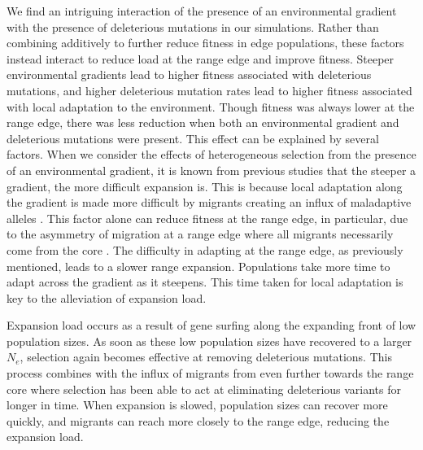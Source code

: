 We find an intriguing interaction of the presence of an environmental gradient with the presence of deleterious mutations in our simulations. Rather than combining additively to further reduce fitness in edge populations, these factors instead interact to reduce load at the range edge and improve fitness. Steeper environmental gradients lead to higher fitness associated with deleterious mutations, and higher deleterious mutation rates lead to higher fitness associated with local adaptation to the environment. Though fitness was always lower at the range edge, there was less reduction when both an environmental gradient and deleterious mutations were present. This effect can be explained by several factors. 
When we consider the effects of heterogeneous selection from the presence of an environmental gradient, it is known from previous studies that the steeper a gradient, the more difficult expansion is. This is because local adaptation along the gradient is made more difficult by migrants creating an influx of maladaptive alleles \citep{Kirkpatrick:1997, Barton:2001, Polechova:2015}. This factor alone can reduce fitness at the range edge, in particular, due to the asymmetry of migration at a range edge where all migrants necessarily come from the core \citep{Kirkpatrick:1997}. The difficulty in adapting at the range edge, as previously mentioned, leads to a slower range expansion. Populations take more time to adapt across the gradient as it steepens. This time taken for local adaptation is key to the alleviation of expansion load.

Expansion load occurs as a result of gene surfing along the expanding front of low population sizes. As soon as these low population sizes have recovered to a larger $N_e$, selection again becomes effective at removing deleterious mutations. This process combines with the influx of migrants from even further towards the range core where selection has been able to act at eliminating deleterious variants for longer in time. When expansion is slowed, population sizes can recover more quickly, and migrants can reach more closely to the range edge, reducing the expansion load.

